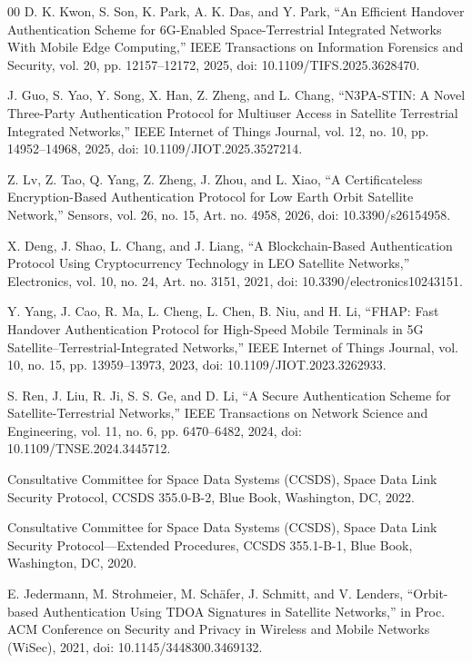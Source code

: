 \documentclass[conference]{IEEEtran}
\begin{document}
\begin{thebibliography}{00}
D. K. Kwon, S. Son, K. Park, A. K. Das, and Y. Park, ``An Efficient Handover Authentication Scheme for 6G-Enabled Space-Terrestrial Integrated Networks With Mobile Edge Computing,'' IEEE Transactions on Information Forensics and Security, vol. 20, pp. 12157--12172, 2025, doi: 10.1109/TIFS.2025.3628470.

J. Guo, S. Yao, Y. Song, X. Han, Z. Zheng, and L. Chang, ``N3PA-STIN: A Novel Three-Party Authentication Protocol for Multiuser Access in Satellite Terrestrial Integrated Networks,'' IEEE Internet of Things Journal, vol. 12, no. 10, pp. 14952--14968, 2025, doi: 10.1109/JIOT.2025.3527214.
 
Z. Lv, Z. Tao, Q. Yang, Z. Zheng, J. Zhou, and L. Xiao, ``A Certificateless Encryption-Based Authentication Protocol for Low Earth Orbit Satellite Network,'' Sensors, vol. 26, no. 15, Art. no. 4958, 2026, doi: 10.3390/s26154958.

X. Deng, J. Shao, L. Chang, and J. Liang, ``A Blockchain-Based Authentication Protocol Using Cryptocurrency Technology in LEO Satellite Networks,'' Electronics, vol. 10, no. 24, Art. no. 3151, 2021, doi: 10.3390/electronics10243151.

 Y. Yang, J. Cao, R. Ma, L. Cheng, L. Chen, B. Niu, and H. Li, ``FHAP: Fast Handover Authentication Protocol for High-Speed Mobile Terminals in 5G Satellite--Terrestrial-Integrated Networks,'' IEEE Internet of Things Journal, vol. 10, no. 15, pp. 13959--13973, 2023, doi: 10.1109/JIOT.2023.3262933.

S. Ren, J. Liu, R. Ji, S. S. Ge, and D. Li, ``A Secure Authentication Scheme for Satellite-Terrestrial Networks,'' IEEE Transactions on Network Science and Engineering, vol. 11, no. 6, pp. 6470--6482, 2024, doi: 10.1109/TNSE.2024.3445712.

Consultative Committee for Space Data Systems (CCSDS), Space Data Link Security Protocol, CCSDS 355.0-B-2, Blue Book, Washington, DC, 2022.

Consultative Committee for Space Data Systems (CCSDS), Space Data Link Security Protocol---Extended Procedures, CCSDS 355.1-B-1, Blue Book, Washington, DC, 2020.

E. Jedermann, M. Strohmeier, M. Schäfer, J. Schmitt, and V. Lenders, ``Orbit-based Authentication Using TDOA Signatures in Satellite Networks,'' in Proc. ACM Conference on Security and Privacy in Wireless and Mobile Networks (WiSec), 2021, doi: 10.1145/3448300.3469132.


\end{thebibliography}
\end{document}
